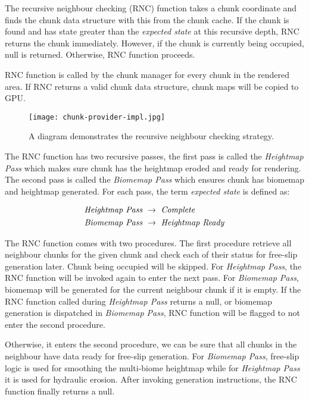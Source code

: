 \documentclass[oneside, a4paper]{report}
\begin{document}
    The recursive neighbour checking (RNC) function takes a chunk coordinate and finds the chunk data structure with this from the chunk cache. If the chunk is found and has state greater than the \textit{expected state} at this recursive depth, RNC returns the chunk immediately. However, if the chunk is currently being occupied, null is returned. Otherwise, RNC function proceeds.

    RNC function is called by the chunk manager for every chunk in the rendered area. If RNC returns a valid chunk data structure, chunk maps will be copied to GPU.

    \begin{figure}[H]
        \center
        \texttt{[image: chunk-provider-impl.jpg]}
        \caption{A diagram demonstrates the recursive neighbour checking strategy.}
    \end{figure}

    The RNC function has two recursive passes, the first pass is called the \textit{Heightmap Pass} which makes sure chunk has the heightmap eroded and ready for rendering. The second pass is called the \textit{Biomemap Pass} which ensures chunk has biomemap and heightmap generated. For each pass, the term \textit{expected state} is defined as:

    \begin{align*}
        \text{\textit{Heightmap Pass} } &\rightarrow \text{ \textit{Complete}} \\
        \text{\textit{Biomemap Pass} } &\rightarrow \text{ \textit{Heightmap Ready}}
    \end{align*}

    The RNC function comes with two procedures. The first procedure retrieve all neighbour chunks for the given chunk and check each of their status for free-slip generation later. Chunk being occupied will be skipped. For \textit{Heightmap Pass}, the RNC function will be invoked again to enter the next pass. For \textit{Biomemap Pass}, biomemap will be generated for the current neighbour chunk if it is empty. If the RNC function called during \textit{Heightmap Pass} returns a null, or biomemap generation is dispatched in \textit{Biomemap Pass}, RNC function will be flagged to not enter the second procedure.

    Otherwise, it enters the second procedure, we can be sure that all chunks in the neighbour have data ready for free-slip generation. For \textit{Biomemap Pass}, free-slip logic is used for smoothing the multi-biome heightmap while for \textit{Heightmap Pass} it is used for hydraulic erosion. After invoking generation instructions, the RNC function finally returns a null.
\end{document}
